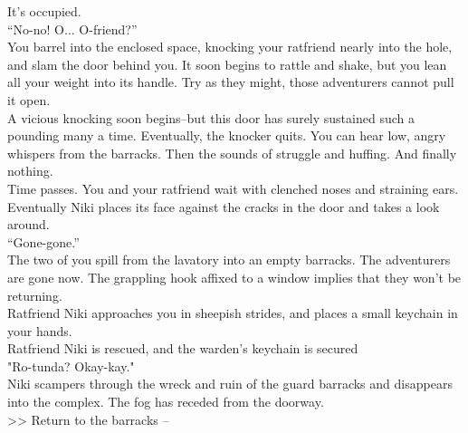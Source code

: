 It’s occupied.\\

“No-no! O... O-friend?”\\

You barrel into the enclosed space, knocking your ratfriend nearly into the hole, and slam the door behind you. It soon begins to rattle and shake, but you lean all your weight into its handle. Try as they might, those adventurers cannot pull it open.\\

A vicious knocking soon begins--but this door has surely sustained such a pounding many a time. Eventually, the knocker quits. You can hear low, angry whispers from the barracks. Then the sounds of struggle and huffing. And finally nothing.\\

Time passes. You and your ratfriend wait with clenched noses and straining ears. Eventually Niki places its face against the cracks in the door and takes a look around.\\

“Gone-gone.”\\

The two of you spill from the lavatory into an empty barracks. The adventurers are gone now. The grappling hook affixed to a window implies that they won't be returning.\\

Ratfriend Niki approaches you in sheepish strides, and places a small keychain in your hands.\\
 Ratfriend Niki is rescued, and the warden's keychain is secured\\

"Ro-tunda? Okay-kay."\\

Niki scampers through the wreck and ruin of the guard barracks and disappears into the complex. The fog has receded from the doorway.\\

>> Return to the barracks -- 
